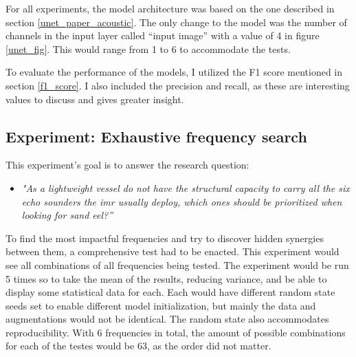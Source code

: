         
        For all experiments, the model architecture was based on the one described in section \ref{unet_paper_acoustic}. The only change to the model was the number of channels in the input layer called “input image” with a value of 4 in figure \ref{unet_fig}. This would range from 1 to 6 to accommodate the tests.
        
        To evaluate the performance of the models, I utilized the F1 score mentioned in section \ref{f1_score}. I also included the precision and recall, as these are interesting values to discuss and gives greater insight.
        
    
    \subsection{Experiment: Exhaustive frequency search}
        This experiment's goal is to answer the research question:
        \begin{itemize}
            \item \textit{"As a lightweight vessel do not have the structural capacity to carry all the six echo sounders the \gls{imr} usually deploy, which ones should be prioritized when looking for sand eel?”}
        \end{itemize}
    
        To find the most impactful frequencies and try to discover hidden synergies between them, a comprehensive test had to be enacted. This experiment would see all combinations of all frequencies being tested. The experiment would be run 5 times so to take the mean of the results,  reducing variance, and be able to display some statistical data for each. Each would have different random state seeds set to enable different model initialization, but mainly the data and augmentations would not be identical. The random state also accommodates reproducibility. With 6 frequencies in total, the amount of possible combinations for each of the testes would be 63, as the order did not matter.
        
